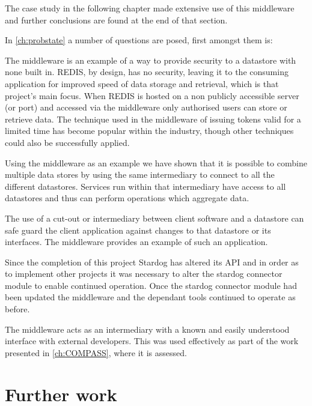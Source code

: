 The case study in the following chapter made extensive use of this middleware and further conclusions are found at the end of that section.

In \autoref{ch:probstate} a number of questions are posed, first amongst them is:

\textit{\QuestionSecurity} 

The middleware is an example of a way to provide security to a datastore with none built in. REDIS, by design, has no security, leaving it to the consuming application for improved speed of data storage and retrieval, which is that project's main focus. When REDIS is hosted on a non publicly accessible server (or port) and accessed via the middleware only authorised users can store or retrieve data. The technique used in the middleware of issuing tokens valid for a limited time has become popular within the industry, though other techniques could also be successfully applied. 

\textit{\QuestionCombine}

Using the middleware as an example we have shown that it is possible to combine multiple data stores by using the same intermediary to connect to all the different datastores. Services run within that intermediary have access to all datastores and thus can perform operations which aggregate data. 

\textit{\QuestionChange}

The use of a cut-out or intermediary between client software and a datastore can safe guard the client application against changes to that datastore or its interfaces. The middleware provides an example of such an application. 

Since the completion of this project Stardog has altered its API and in order as to implement other projects it was necessary to alter the stardog connector module to enable continued operation. Once the stardog connector module had been updated the middleware and the dependant tools continued to operate as before. 

\textit{\QuestionSkillz}

The middleware acts as an intermediary with a known and easily understood interface with external developers. This was used effectively as part of the work presented in \autoref{ch:COMPASS}, where it is assessed.


\section{Further work}

